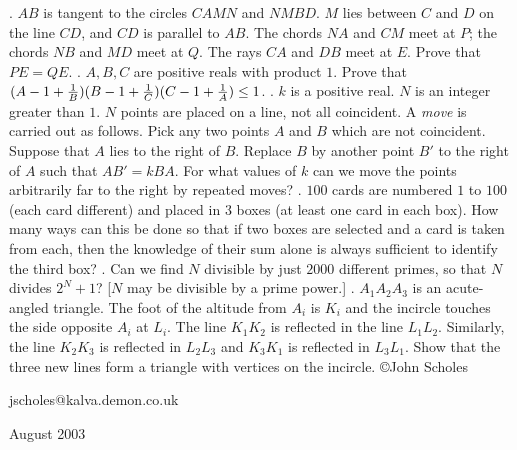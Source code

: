 \nopagenumbers
{}
\vskip 25pt
. $AB$ is tangent to the circles $CAMN$ and $NMBD$. $M$ lies between $C$ and $D$ on the line $CD$, and $CD$ is parallel to $AB$. The chords $NA$ and $CM$ meet at $P$; the chords $NB$ and $MD$ meet at $Q$. The rays $CA$ and $DB$ meet at $E$. Prove that $PE = QE$.
\vskip 12pt
. $A, B, C$ are positive reals with product $1$. Prove that $(A - 1 + {1 \over B})(B - 1 + {1 \over C})(C - 1 + {1 \over A}) \le 1$.
\vskip 12pt
. $k$ is a positive real. $N$ is an integer greater than $1$. $N$ points are placed on a line, not all coincident. A {\it move} is carried out as follows. Pick any two points $A$ and $B$ which are not coincident. Suppose that $A$ lies to the right of $B$. Replace $B$ by another point $B'$ to the right of $A$ such that $AB' = k BA$. For what values of $k$ can we move the points arbitrarily far to the right by repeated moves?
\vskip 12pt
. $100$ cards are numbered $1$ to $100$ (each card different) and placed in $3$ boxes (at least one card in each box). How many ways can this be done so that if two boxes are selected and a card is taken from each, then the knowledge of their sum alone is always sufficient to identify the third box?
\vskip 12pt
. Can we find $N$ divisible by just $2000$ different primes, so that $N$ divides $2^N + 1$? [$N$ may be divisible by a prime power.]
\vskip 12pt
. $A_1A_2A_3$ is an acute-angled triangle. The foot of the altitude from $A_i$ is $K_i$ and the incircle touches the side opposite $A_i$ at $L_i$. The line $K_1K_2$ is reflected in the line $L_1L_2$. Similarly, the line $K_2K_3$ is reflected in $L_2L_3$ and $K_3K_1$ is reflected in $L_3L_1$. Show that the three new lines form a triangle with vertices on the incircle.
\vskip 20pt
\noindent \copyright John Scholes

\noindent jscholes@kalva.demon.co.uk

 August 2003

\bye
